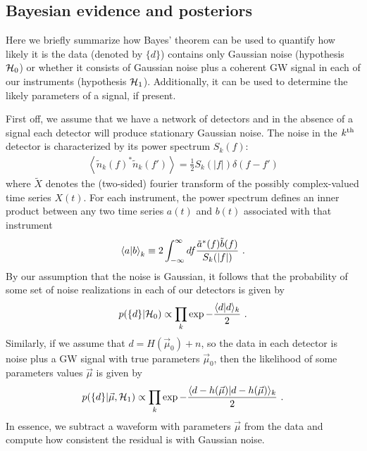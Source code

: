 \subsection{Bayesian evidence and posteriors}


Here we briefly summarize how Bayes' theorem can be used to quantify how likely it is the data 
(denoted by $\{d\}$) contains only Gaussian noise (hypothesis ${\cal H}_0$) 
or whether it consists of Gaussian noise plus a coherent GW signal in each of our instruments
(hypothesis ${\cal H}_1$). Additionally, it can be used to determine the likely parameters of a signal,
if present.

First off, we assume that we have a network of detectors and in the absence of a signal 
each detector will produce stationary Gaussian noise.
The noise in the $k^{\rm th}$ detector is characterized by its power spectrum $S_k(f)$:
\begin{eqnarray}
\left<\tilde{n}_k(f)^* \tilde{n}_k(f')\right> = \frac{1}{2} S_k(|f|) \delta(f-f')
\end{eqnarray}
where  $\tilde{X}$ denotes the (two-sided) fourier transform of the possibly complex-valued time series $X(t)$.  
For each instrument, the power spectrum defines an inner product between any two time series 
$a(t)$ and $b(t)$ associated with that instrument
\begin{eqnarray} \label{eq:InnerProduct}
\left\langle a|b\right\rangle_k \equiv 2 \int_{-\infty}^{\infty} df \frac{\tilde{a}^*(f)\tilde{b}(f)}{S_k(|f|)}\ .
\end{eqnarray}
By our assumption that the noise is Gaussian, it follows that the probability of some set of noise
realizations in each of our detectors is given by
\begin{equation}
p(\{d\}|{\cal H}_0) \propto \prod_k \exp - \frac{ \langle d | d \rangle_k}{2}\ .
\end{equation}
Similarly, if we assume that $d = H(\vec{\mu}_0) + n$, so the data in each detector is noise plus a GW signal 
with true parameters $\vec{\mu}_0$, then the likelihood of some parameters values $\vec{\mu}$ is given by
\begin{equation}
p(\{d\}|\vec{\mu},{\cal H}_1) \propto \prod_k \exp - \frac{ \langle d - h(\vec{\mu}) | d - h(\vec{\mu}) \rangle_k }{2}\ .
\end{equation}
In essence, we subtract a waveform with parameters $\vec{\mu}$ from the data 
and compute how consistent the residual is with Gaussian noise.

